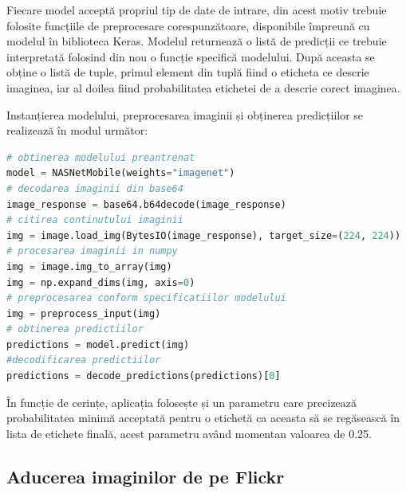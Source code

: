 Fiecare model acceptă propriul tip de date de intrare, din acest motiv trebuie folosite funcțiile de preprocesare corespunzătoare, disponibile împreună cu modelul în biblioteca Keras. Modelul returnează o listă de predicții ce trebuie interpretată folosind din nou o funcție specifică modelului. După aceasta se obține  o listă de tuple, primul element din tuplă fiind o eticheta ce  descrie imaginea, iar al doilea fiind probabilitatea etichetei de a descrie corect imaginea.

Instanțierea modelului, preprocesarea imaginii și obținerea predicțiilor se realizează în modul următor:

 
 
 
\lstset{style=mystyle}

\begin{lstlisting}[language=Python]
# obtinerea modelului preantrenat
model = NASNetMobile(weights="imagenet")
# decodarea imaginii din base64
image_response = base64.b64decode(image_response)
# citirea continutului imaginii
img = image.load_img(BytesIO(image_response), target_size=(224, 224))
# procesarea imaginii in numpy
img = image.img_to_array(img)
img = np.expand_dims(img, axis=0)
# preprocesarea conform specificatiilor modelului
img = preprocess_input(img)
# obtinerea predictiilor
predictions = model.predict(img)
#decodificarea predictiilor
predictions = decode_predictions(predictions)[0]
\end{lstlisting}

În funcție de cerințe, aplicația folosește și un parametru care precizează probabilitatea minimă acceptată pentru o etichetă ca aceasta să se regăsească în lista de etichete finală, acest parametru având momentan valoarea de 0.25.

\subsection{Aducerea imaginilor de pe Flickr}